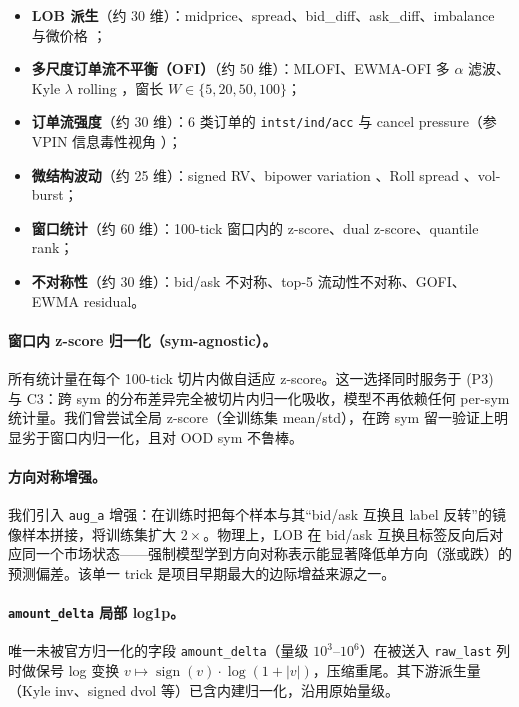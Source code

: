 \documentclass[11pt]{article}
\begin{document}
\begin{itemize}
  \item \textbf{LOB 派生}（约 30 维）：midprice、spread、bid\_diff、ask\_diff、imbalance 与微价格 \cite{microprice}；
  \item \textbf{多尺度订单流不平衡（OFI）}（约 50 维）：MLOFI、EWMA-OFI 多 $\alpha$ 滤波、Kyle $\lambda$ rolling \cite{ofi,kyle1985,deepofi}，窗长 $W\!\in\!\{5,20,50,100\}$；
  \item \textbf{订单流强度}（约 30 维）：6 类订单的 \texttt{intst/ind/acc} 与 cancel pressure（参 VPIN 信息毒性视角 \cite{vpin}）；
  \item \textbf{微结构波动}（约 25 维）：signed RV、bipower variation \cite{bns_bipower}、Roll spread \cite{roll1984}、vol-burst；
  \item \textbf{窗口统计}（约 60 维）：100-tick 窗口内的 z-score、dual z-score、quantile rank；
  \item \textbf{不对称性}（约 30 维）：bid/ask 不对称、top-5 流动性不对称、GOFI、EWMA residual。
\end{itemize}

\paragraph{窗口内 z-score 归一化（sym-agnostic）。}
所有统计量在每个 100-tick 切片内做自适应 z-score。这一选择同时服务于 (P3) 与 C3：跨 sym 的分布差异完全被切片内归一化吸收，模型不再依赖任何 per-sym 统计量。我们曾尝试全局 z-score（全训练集 mean/std），在跨 sym 留一验证上明显劣于窗口内归一化，且对 OOD sym 不鲁棒。

\paragraph{方向对称增强。}
我们引入 \texttt{aug\_a} 增强：在训练时把每个样本与其``bid/ask 互换且 label 反转''的镜像样本拼接，将训练集扩大 $2\times$。物理上，LOB 在 bid/ask 互换且标签反向后对应同一个市场状态——强制模型学到方向对称表示能显著降低单方向（涨或跌）的预测偏差。该单一 trick 是项目早期最大的边际增益来源之一。

\paragraph{\texttt{amount\_delta} 局部 log1p。}
唯一未被官方归一化的字段 \texttt{amount\_delta}（量级 $10^3$--$10^6$）在被送入 \texttt{raw\_last} 列时做保号 log 变换 $v\mapsto\operatorname{sign}(v)\cdot\log(1+|v|)$，压缩重尾。其下游派生量（Kyle inv、signed dvol 等）已含内建归一化，沿用原始量级。
\end{document}
